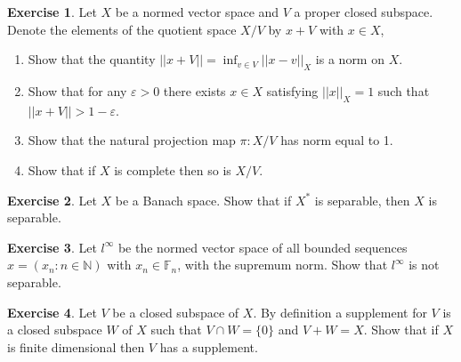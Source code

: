 \documentclass{article}
\newcommand{\bF}{\mathbb{F}}
\newcommand{\bN}{\mathbb{N}}
\newcommand{\ve}{\varepsilon}
\theoremstyle{definition}
\newtheorem{exercise}{Exercise}
\begin{document}
\begin{exercise}
    Let $X$ be a normed vector space and $V$ a proper closed subspace. Denote the elements of the quotient space $X/V$ by $x + V$ with $x \in X$, 
\begin{enumerate}[label = (\alph*)]
    \item Show that the quantity $||x+V|| = \inf_{v \in V}||x-v||_X$ is a norm on $X$. 
    \item Show that for any $\ve>0$ there exists $x \in X$ satisfying $||x||_X=1$ such that $||x+V|| > 1 - \ve$. 
    \item Show that the natural projection map $\pi : X /V$ has norm equal to 1. 
    \item Show that if $X$ is complete then so is $X/V$.
\end{enumerate}
\end{exercise}

\begin{exercise}
    Let $X$ be a Banach space. Show that if $X^*$ is separable, then $X$ is separable. 
\end{exercise}

\begin{exercise}
    Let $l^{\infty}$ be the normed vector space of all bounded sequences $x = (x_n \colon n \in \bN)$ with $x_n \in \bF_n$, with the supremum norm. Show that $l^{\infty}$ is not separable. 
\end{exercise}

\begin{exercise}
    Let $V$ be a closed subspace of $X$. By definition a supplement for $V$ is a closed subspace $W$ of $X$ such that $V \cap W = \{0\}$ and $V+W=X$. Show that if $X$ is finite dimensional then $V$ has a supplement. 
\end{exercise}
\end{document}
